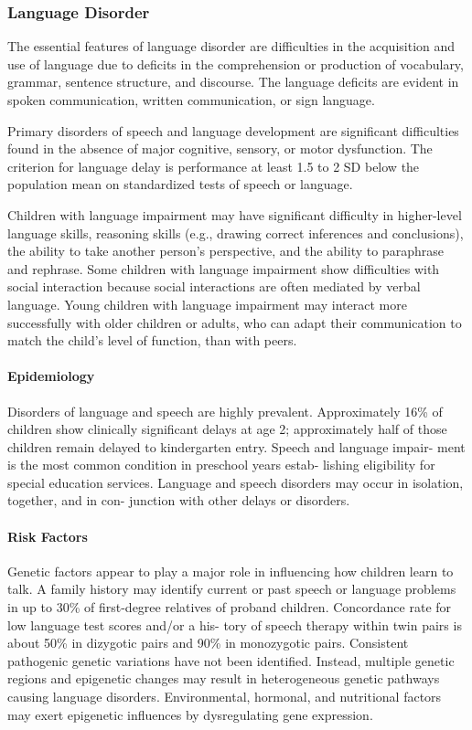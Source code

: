 \subsubsection{Language Disorder}
The essential features of language disorder are difficulties in the acquisition
and use of language due to deficits in the comprehension or production of
vocabulary, grammar, sentence structure, and discourse. The language deficits
are evident in spoken communication, written communication, or sign language.
\cite{DSM5TR}

Primary disorders of speech and language development are significant
difficulties found in the absence of major cognitive, sensory, or motor
dysfunction. The criterion for language delay is performance at least
1.5 to 2 SD below the population mean on standardized tests
of speech or language. \cite{Feldman44}

Children with language impairment may have
significant difficulty in higher-level language skills,
reasoning skills (e.g., drawing correct inferences and conclusions),
the ability to take another person’s perspective, and the ability to paraphrase
and rephrase. Some children with language impairment show
difficulties with social interaction because social interactions are often
mediated by verbal language. Young children with language impairment may
interact more successfully with older children or adults, who
can adapt their communication to match the child’s level of function,
than with peers. \cite{Nelson53}

\paragraph{Epidemiology}
Disorders of language and speech are highly prevalent.
Approximately 16\% of children show clinically significant
delays at age 2; approximately half of those children remain
delayed to kindergarten entry. Speech and language impair-
ment is the most common condition in preschool years estab-
lishing eligibility for special education services. Language and
speech disorders may occur in isolation, together, and in con-
junction with other delays or disorders. \cite{Feldman44}

\paragraph{Risk Factors}
Genetic factors appear to play a major role in influencing how children
learn to talk. A family history may identify current or past speech or
language problems in up to 30\% of first-degree relatives of proband
children. Concordance rate for low language test scores and/or a his-
tory of speech therapy within twin pairs is about 50\% in dizygotic
pairs and 90\% in monozygotic pairs. Consistent pathogenic genetic
variations have not been identified. Instead, multiple genetic regions
and epigenetic changes may result in heterogeneous genetic pathways
causing language disorders. Environmental, hormonal, and nutritional factors
may exert epigenetic influences by dysregulating gene expression. \cite{Nelson53}

